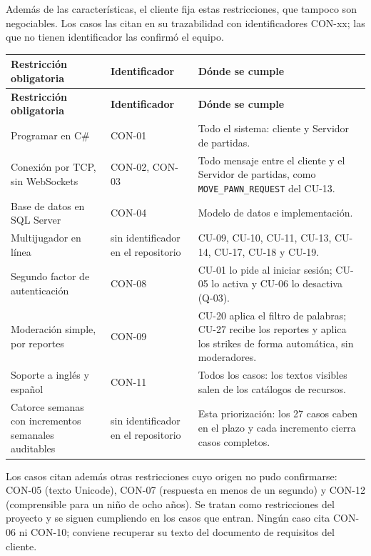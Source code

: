 Además de las características, el cliente fija estas restricciones, que tampoco son negociables. Los casos las citan en su trazabilidad con identificadores \mbox{CON-xx}; las que no tienen identificador las confirmó el equipo.

\begin{center}\small
\begin{longtable}{|L{0.25\textwidth}|L{0.14\textwidth}|L{0.49\textwidth}|}
\hline
\textbf{Restricción obligatoria} & \textbf{Identificador} & \textbf{Dónde se cumple} \\ \hline
\endfirsthead
\hline
\textbf{Restricción obligatoria} & \textbf{Identificador} & \textbf{Dónde se cumple} \\ \hline
\endhead
Programar en C\# & \mbox{CON-01} & Todo el sistema: cliente y Servidor de partidas. \\ \hline
Conexión por TCP, sin WebSockets & \mbox{CON-02}, \mbox{CON-03} & Todo mensaje entre el cliente y el Servidor de partidas, como \texttt{MOVE\_\allowbreak{}PAWN\_\allowbreak{}REQUEST} del \mbox{CU-13}. \\ \hline
Base de datos en SQL Server & \mbox{CON-04} & Modelo de datos e implementación. \\ \hline
Multijugador en línea & sin identificador en el repositorio & \mbox{CU-09}, \mbox{CU-10}, \mbox{CU-11}, \mbox{CU-13}, \mbox{CU-14}, \mbox{CU-17}, \mbox{CU-18} y \mbox{CU-19}. \\ \hline
Segundo factor de autenticación & \mbox{CON-08} & \mbox{CU-01} lo pide al iniciar sesión; \mbox{CU-05} lo activa y \mbox{CU-06} lo desactiva (\mbox{Q-03}). \\ \hline
Moderación simple, por reportes & \mbox{CON-09} & \mbox{CU-20} aplica el filtro de palabras; \mbox{CU-27} recibe los reportes y aplica los strikes de forma automática, sin moderadores. \\ \hline
Soporte a inglés y español & \mbox{CON-11} & Todos los casos: los textos visibles salen de los catálogos de recursos. \\ \hline
Catorce semanas con incrementos semanales auditables & sin identificador en el repositorio & Esta priorización: los 27 casos caben en el plazo y cada incremento cierra casos completos. \\ \hline
\end{longtable}
\end{center}

Los casos citan además otras restricciones cuyo origen no pudo confirmarse: \mbox{CON-05} (texto Unicode), \mbox{CON-07} (respuesta en menos de un segundo) y \mbox{CON-12} (comprensible para un niño de ocho años). Se tratan como restricciones del proyecto y se siguen cumpliendo en los casos que entran. Ningún caso cita \mbox{CON-06} ni \mbox{CON-10}; conviene recuperar su texto del documento de requisitos del cliente.


